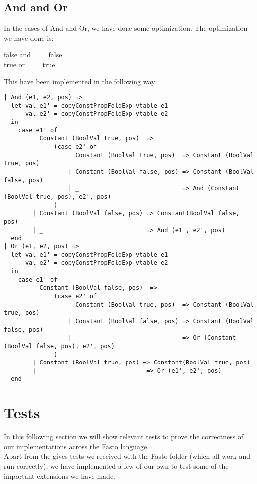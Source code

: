 \documentclass[12pt]{article}
\begin{document}
\begin{center}
\begin{center}
\subsection{And and Or}
Ïn the cases of And and Or, we have done some optimization. The optimization we have done is:
\begin{center}
false and _ = false\\
true or _ = true
\end{center}
This have been implemented in the following way:
\begin{verbatim}
| And (e1, e2, pos) =>
  let val e1' = copyConstPropFoldExp vtable e1
      val e2' = copyConstPropFoldExp vtable e2
  in 
    case e1' of
          Constant (BoolVal true, pos)  => 
              (case e2' of
                    Constant (BoolVal true, pos)  => Constant (BoolVal true, pos)
                  | Constant (BoolVal false, pos) => Constant (BoolVal false, pos)
                  | _                             => And (Constant (BoolVal true, pos), e2', pos)
              )
        | Constant (BoolVal false, pos) => Constant(BoolVal false, pos)
        | _                             => And (e1', e2', pos)
  end
| Or (e1, e2, pos) =>
  let val e1' = copyConstPropFoldExp vtable e1
      val e2' = copyConstPropFoldExp vtable e2
  in 
    case e1' of
          Constant (BoolVal false, pos)  => 
              (case e2' of
                    Constant (BoolVal true, pos)  => Constant (BoolVal true, pos)
                  | Constant (BoolVal false, pos) => Constant (BoolVal false, pos)
                  | _                             => Or (Constant (BoolVal false, pos), e2', pos)
              )
        | Constant (BoolVal true, pos) => Constant(BoolVal true, pos)
        | _                             => Or (e1', e2', pos)
  end
\end{verbatim}

\section{Tests}
In this following section we will show relevant tests to prove the correctness of our implementations across the Fasto language.\\
Apart from the gives tests we received with the Fasto folder (which all work and run correctly), we have implemented a few of our own to test some of the important extensions we have made.

\end{center}
\end{center}
\end{document}
